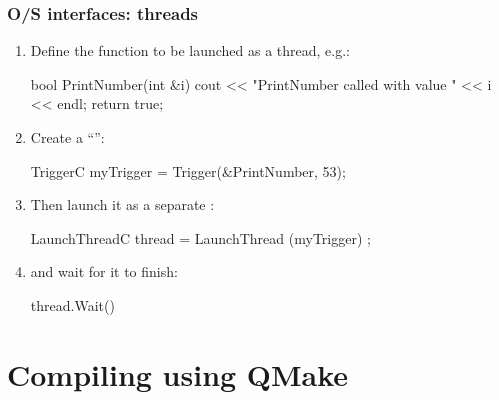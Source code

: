 \documentclass[landscape]{beamer}
\begin{document}
\begin{frame}[fragile]\frametitle{O/S interfaces: threads}

  \begin{enumerate}
  \item Define the function to be launched as a thread, e.g.:

\begin{Code}
  bool PrintNumber(int &i) {
    cout << "PrintNumber called with value " << i << endl;
    return true;
  }
\end{Code}

  \item Create a ``'': 

\begin{Code}
  TriggerC myTrigger = Trigger(&PrintNumber, 53);
\end{Code}

  \item Then launch it as a separate :

\begin{Code}
  LaunchThreadC thread = LaunchThread (myTrigger) ; 
\end{Code}

\item and wait for it to finish:

\begin{Code}
  thread.Wait()
\end{Code}



\end{enumerate}
\end{frame}

\section{Compiling using QMake}
\end{document}
